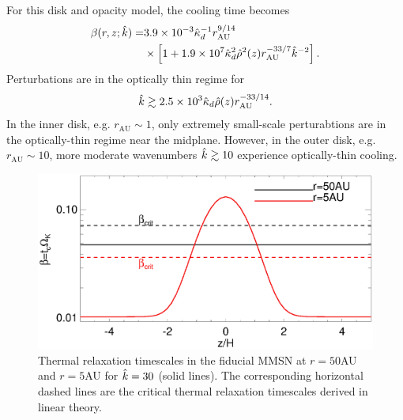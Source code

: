 
For this disk and opacity model, the cooling time becomes
\begin{align}\label{beta_mmsn_simp}
  \beta(r,z;\hat{k})\notag = &3.9\times10^{-3}\hat{\kappa}_d^{-1}
  r_\mathrm{AU}^{9/14}
  \notag\\ &\times \left[1 +
    1.9\times10^7\hat{\kappa}_d^{2}\hat{\rho}^2(z)r_\mathrm{AU}^{-33/7}\hat{k}^{-2}\right]. 
\end{align}
Perturbations are in the optically thin regime for
\begin{align}
  \hat{k}\gtrsim 2.5\times10^3\hat{\kappa}_d\hat{\rho}(z)r_\mathrm{AU}^{-33/14}.  
\end{align}
In the inner disk, e.g. $r_\mathrm{AU}\sim 1$, only
extremely small-scale perturabtions are in the optically-thin
regime near the midplane. However, in the outer disk, e.g. $r_\mathrm{AU}\sim 10$, 
 more moderate wavenumbers $\hat{k}\gtrsim 10$ experience optically-thin cooling.

\begin{figure}
  \includegraphics[width=\linewidth,clip=true,trim=0cm 0cm 0cm
  0cm]{figures/beta_compare}
  \caption{Thermal relaxation timescales in the fiducial MMSN at $r=50$AU
    and $r=5$AU for $\hat{k}=30$ (solid lines). The
    corresponding horizontal dashed lines are the critical thermal
    relaxation timescales derived in linear theory. 
    \label{beta_compare}}
\end{figure}


